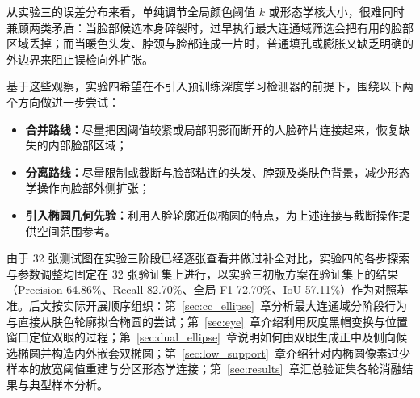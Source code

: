 从实验三的误差分布来看，单纯调节全局颜色阈值 $k$ 或形态学核大小，很难同时兼顾两类矛盾：当脸部候选本身碎裂时，过早执行最大连通域筛选会把有用的脸部区域丢掉；而当暖色头发、脖颈与脸部连成一片时，普通填孔或膨胀又缺乏明确的外边界来阻止误检向外扩张。

基于这些观察，实验四希望在不引入预训练深度学习检测器的前提下，围绕以下两个方向做进一步尝试：
\begin{itemize}
\item \textbf{合并路线：}尽量把因阈值较紧或局部阴影而断开的人脸碎片连接起来，恢复缺失的内部脸部区域；
\item \textbf{分离路线：}尽量限制或截断与脸部粘连的头发、脖颈及类肤色背景，减少形态学操作向脸部外侧扩张；
\item \textbf{引入椭圆几何先验：}利用人脸轮廓近似椭圆的特点\cite{wang1999frontal,garcia1999face}，为上述连接与截断操作提供空间范围参考。
\end{itemize}

由于 32 张测试图在实验三阶段已经逐张查看并做过补全对比，实验四的各步探索与参数调整均固定在 32 张验证集上进行，以实验三初版方案在验证集上的结果（Precision 64.86\%、Recall 82.70\%、全局 F1 72.70\%、IoU 57.11\%）作为对照基准。后文按实际开展顺序组织：第~\ref{sec:cc_ellipse}~章分析最大连通域分阶段行为与直接从肤色轮廓拟合椭圆的尝试；第~\ref{sec:eye}~章介绍利用灰度黑帽变换与位置窗口定位双眼的过程；第~\ref{sec:dual_ellipse}~章说明如何由双眼生成正中及侧向候选椭圆并构造内外嵌套双椭圆；第~\ref{sec:low_support}~章介绍针对内椭圆像素过少样本的放宽阈值重建与分区形态学连接；第~\ref{sec:results}~章汇总验证集各轮消融结果与典型样本分析。
